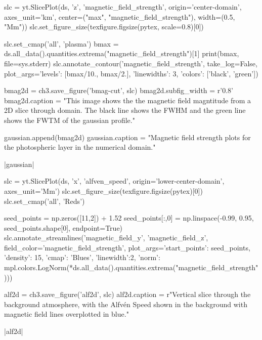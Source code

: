 \begin{pycode}[chapter3]
slc = yt.SlicePlot(ds, 'z', 'magnetic_field_strength', origin='center-domain',
                   axes_unit='km', center=("max", "magnetic_field_strength"),
                   width=(0.5, "Mm"))
slc.set_figure_size(texfigure.figsize(pytex, scale=0.8)[0])

slc.set_cmap('all', 'plasma')
bmax = ds.all_data().quantities.extrema("magnetic_field_strength")[1]
print(bmax, file=sys.stderr)
slc.annotate_contour('magnetic_field_strength', take_log=False,
                     plot_args={'levels': [bmax/10., bmax/2.],
                                'linewidths': 3,
                                'colors': ['black', 'green']})

bmag2d = ch3.save_figure('bmag-cut', slc)
bmag2d.subfig_width = r'0.8\columnwidth'
bmag2d.caption = "This image shows the the magnetic field magntitude from a 2D slice through domain. The black line shows the FWHM and the green line shows the FWTM of the gaussian profile."

gaussian.append(bmag2d)
gaussian.caption = "Magnetic field strength plots for the photospheric layer in the numerical domain."

\end{pycode}

\py[chapter3]|gaussian|

\begin{pycode}[chapter3]
slc = yt.SlicePlot(ds, 'x', 'alfven_speed', origin='lower-center-domain',
                   axes_unit='Mm')
slc.set_figure_size(texfigure.figsize(pytex)[0])
slc.set_cmap('all', 'Reds')

seed_points = np.zeros([11,2]) + 1.52
seed_points[:,0] = np.linspace(-0.99, 0.95, seed_points.shape[0], endpoint=True)
slc.annotate_streamlines('magnetic_field_y', 'magnetic_field_z',
                         field_color='magnetic_field_strength',
                         plot_args={'start_points': seed_points, 'density': 15,
                                    'cmap': 'Blues', 'linewidth':2,
                                    'norm': mpl.colors.LogNorm(*ds.all_data().quantities.extrema("magnetic_field_strength"))})

alf2d = ch3.save_figure('alf2d', slc)
alf2d.caption = r"Vertical slice through the background atmosphere, with the Alfv\'en Speed shown in the background with magnetic field lines overplotted in blue."
\end{pycode}

\py[chapter3]|alf2d|

